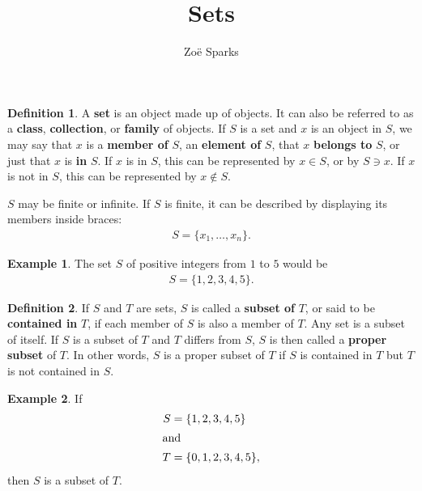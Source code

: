 \documentclass[12pt]{article}
\title{Sets}
\author{Zoë Sparks}
\begin{document}
\theoremstyle{definition}

\newtheorem{thm}{Theorem}
\newtheorem*{nthm}{Theorem}
\newtheorem{sthm}{}[thm]
\newtheorem{lemma}{Lemma}[thm]
\newtheorem*{nlemma}{Lemma}
\newtheorem{cor}{Corollary}[thm]
\newtheorem*{prop}{Property}
\newtheorem*{defn}{Definition}
\newtheorem*{comm}{Comment}
\newtheorem*{exm}{Example}

\maketitle

\begin{defn}
  A \textbf{set} is an object made up of objects. It can also be referred to as a
  \textbf{class}, \textbf{collection}, or \textbf{family} of objects. If $S$ is a set
  and $x$ is an object in $S$, we may say that $x$ is a \textbf{member of} $S$, an
  \textbf{element of} $S$, that $x$ \textbf{belongs to} $S$, or just that $x$ is
  \textbf{in} $S$. If $x$ is in $S$, this can be represented by $x \in S$, or by $S
  \ni x$. If $x$ is not in $S$, this can be represented by $x \notin S$.

  $S$ may be finite or infinite. If $S$ is finite, it can be described by displaying
  its members inside braces:
  \begin{align*}
    S = \{x_1,\ldots,x_n\}.
  \end{align*}
\end{defn}

\begin{exm}
  The set $S$ of positive integers from $1$ to $5$ would be
  \begin{align*}
    S = \{1,2,3,4,5\}.
  \end{align*}
\end{exm}

\begin{defn}
  If $S$ and $T$ are sets, $S$ is called a \textbf{subset of} $T$, or said to be
  \textbf{contained in} $T$, if each member of $S$ is also a member of $T$. Any set
  is a subset of itself. If $S$ is a subset of $T$ and $T$ differs from $S$, $S$ is
  then called a \textbf{proper subset} of $T$. In other words, $S$ is a proper subset
  of $T$ if $S$ is contained in $T$ but $T$ is not contained in $S$.
\end{defn}

\begin{exm}
  If
  \begin{align*}
    S &= \{1,2,3,4,5\}\\
    \shortintertext{and}
    T &= \{0,1,2,3,4,5\},
  \end{align*}
  then $S$ is a subset of $T$.
\end{exm}
\end{document}
